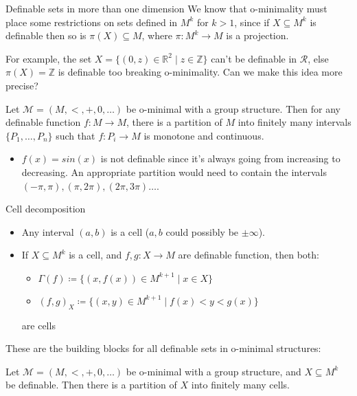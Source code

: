 \documentclass{beamer}
\begin{document}
\begin{frame}{Definable sets in more than one dimension}
    We know that o-minimality must place some restrictions on sets defined in $M^k$ for $k > 1$, since if $X \subseteq M^k$ is definable then so is $\pi(X) \subseteq M$, where $\pi: M^k \to M$ is a projection.
    
    For example, the set $ X = \{(0, z) \in \mathbb{R}^2 \mid z \in \mathbb{Z} \}$ can't be definable in $\mathcal{R}$, else $\pi(X) = \mathbb{Z}$ is definable too breaking o-minimality. Can we make this idea more precise?
    
    \begin{theorem}
        Let $\mathcal{M} = (M, <, +, 0, \ldots)$ be o-minimal with a group structure. Then for any definable function $f: M \to M$, there is a partition of $M$ into finitely many intervals $\{P_1, \ldots, P_n\}$ such that $f:P_i \to M$ is monotone and continuous.
    \end{theorem}
\end{frame}

\begin{frame}
    \begin{example}
         \begin{itemize}
             \item $f(x) = sin(x)$ is not definable since it's always going from increasing to decreasing. An appropriate partition would need to contain the intervals $(-\pi, \pi), (\pi, 2\pi), (2\pi, 3\pi) \ldots$. 
         \end{itemize}
    \end{example}
\end{frame}

\begin{frame}{Cell decomposition}
    \begin{itemize}
        \item Any interval $(a,b)$ is a cell ($a, b$ could possibly be $\pm \infty$).
        \item If $X \subseteq M^k$ is a cell, and $f,g:X \to M$ are definable function, then both:
            \begin{itemize}
                \item $\Gamma(f) \coloneqq \{(x, f(x)) \in M^{k+1} \mid x \in X \}$
                \item $(f,g)_X \coloneqq \{(x, y) \in M^{k+1} \mid f(x) < y < g(x) \}$
            \end{itemize}
        are cells
    \end{itemize}
    
    These are the building blocks for all definable sets in o-minimal structures:
    
    \begin{theorem}
        Let $\mathcal{M} = (M, <, +, 0, \ldots)$ be o-minimal with a group structure, and $X \subseteq M^k$ be definable. Then there is a partition of $X$ into finitely many cells.
    \end{theorem}
\end{frame}
\end{document}
